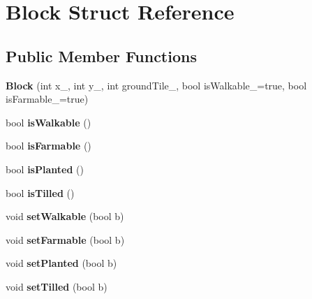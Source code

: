 \hypertarget{struct_block}{\section{Block Struct Reference}
\label{struct_block}
}
\subsection*{Public Member Functions}
\begin{DoxyCompactItemize}
\item 
\hypertarget{struct_block_a148c2816eb1e9eae9e956512eb3e7025}{{\bfseries Block} (int x\-\_\-, int y\-\_\-, int ground\-Tile\-\_\-, bool is\-Walkable\-\_\-=true, bool is\-Farmable\-\_\-=true)}\label{struct_block_a148c2816eb1e9eae9e956512eb3e7025}

\item 
\hypertarget{struct_block_a5538b540df19626cdc7b218311af6b7c}{bool {\bfseries is\-Walkable} ()}\label{struct_block_a5538b540df19626cdc7b218311af6b7c}

\item 
\hypertarget{struct_block_a761d37f4e22b28282e5b73796221a8c5}{bool {\bfseries is\-Farmable} ()}\label{struct_block_a761d37f4e22b28282e5b73796221a8c5}

\item 
\hypertarget{struct_block_a89e330e315f0f352f164618ca661ea49}{bool {\bfseries is\-Planted} ()}\label{struct_block_a89e330e315f0f352f164618ca661ea49}

\item 
\hypertarget{struct_block_a72df9b60b3b8437046ff11532db590b0}{bool {\bfseries is\-Tilled} ()}\label{struct_block_a72df9b60b3b8437046ff11532db590b0}

\item 
\hypertarget{struct_block_a495e5a9b45f4208e8cee275fe2678748}{void {\bfseries set\-Walkable} (bool b)}\label{struct_block_a495e5a9b45f4208e8cee275fe2678748}

\item 
\hypertarget{struct_block_a76ff73a12407b56484089d13cbf16c57}{void {\bfseries set\-Farmable} (bool b)}\label{struct_block_a76ff73a12407b56484089d13cbf16c57}

\item 
\hypertarget{struct_block_a2f89a54fa20a792694de988f86d47e19}{void {\bfseries set\-Planted} (bool b)}\label{struct_block_a2f89a54fa20a792694de988f86d47e19}

\item 
\hypertarget{struct_block_a11a7aff3576e1a56480a4eeca5092a5f}{void {\bfseries set\-Tilled} (bool b)}\label{struct_block_a11a7aff3576e1a56480a4eeca5092a5f}

\end{DoxyCompactItemize}
